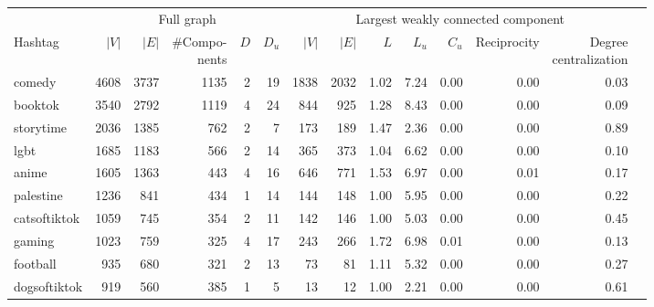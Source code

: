 \begin{tabular}{l|rrrrr|rrrrrrrr}
    \toprule
    \multicolumn{1}{c|}{} & \multicolumn{5}{c|}{Full graph} & \multicolumn{7}{c}{Largest weakly connected component} \\ 
             Hashtag &  $|V|$ &  $|E|$ & \makecell{\#Compo-\\nents} & $D$ &  $D_u$ &  $|V|$ &  $|E|$ &  $L$ &  $L_u$ &  $C_u$ &  Reciprocity &  \makecell{Degree\\ centralization} \\ 
    \midrule
              comedy &   4608 &   3737 &                       1135 &   2 &     19 &   1838 &   2032 & 1.02 &   7.24 &   0.00 &         0.00 &                                0.03 \\
             booktok &   3540 &   2792 &                       1119 &   4 &     24 &    844 &    925 & 1.28 &   8.43 &   0.00 &         0.00 &                                0.09 \\
           storytime &   2036 &   1385 &                        762 &   2 &      7 &    173 &    189 & 1.47 &   2.36 &   0.00 &         0.00 &                                0.89 \\
                lgbt &   1685 &   1183 &                        566 &   2 &     14 &    365 &    373 & 1.04 &   6.62 &   0.00 &         0.00 &                                0.10 \\
               anime &   1605 &   1363 &                        443 &   4 &     16 &    646 &    771 & 1.53 &   6.97 &   0.00 &         0.01 &                                0.17 \\
           palestine &   1236 &    841 &                        434 &   1 &     14 &    144 &    148 & 1.00 &   5.95 &   0.00 &         0.00 &                                0.22 \\
        catsoftiktok &   1059 &    745 &                        354 &   2 &     11 &    142 &    146 & 1.00 &   5.03 &   0.00 &         0.00 &                                0.45 \\
              gaming &   1023 &    759 &                        325 &   4 &     17 &    243 &    266 & 1.72 &   6.98 &   0.01 &         0.00 &                                0.13 \\
            football &    935 &    680 &                        321 &   2 &     13 &     73 &     81 & 1.11 &   5.32 &   0.00 &         0.00 &                                0.27 \\
        dogsoftiktok &    919 &    560 &                        385 &   1 &      5 &     13 &     12 & 1.00 &   2.21 &   0.00 &         0.00 &                                0.61 \\

\end{tabular}
